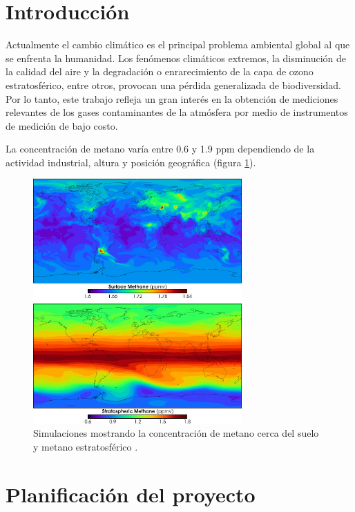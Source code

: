 \documentclass[titlepage,11pt]{article}
\begin{document}




\section{Introducción}

Actualmente el cambio climático es el principal problema ambiental global al que se enfrenta la humanidad. Los fenómenos climáticos extremos, la disminución de la calidad del aire y la degradación o enrarecimiento de la capa de ozono estratosférico, entre otros, provocan una pérdida generalizada de biodiversidad. Por lo tanto, este trabajo refleja un gran interés en la obtención de mediciones relevantes de los gases contaminantes de la atmósfera por medio de instrumentos de medición de bajo costo.

La concentración de metano varía entre 0.6 y 1.9 ppm dependiendo de la actividad industrial, altura y posición geográfica (figura \ref{fig:atmosphericMethane}).

\begin{figure}[htb!]
    \centering
    \includegraphics[width=8cm]{fig/AtmosphericMethane.png}
    \caption{Simulaciones mostrando la concentración de metano cerca del suelo y metano estratosférico \cite{hu2018global}.}
    \label{fig:atmosphericMethane}
\end{figure}

\section{Planificación del proyecto}
\end{document}
